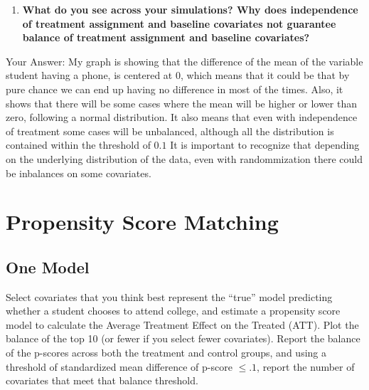 \documentclass[
]{article}
\begin{document}
\begin{enumerate}
    \item \textbf{What do you see across your simulations? Why does independence of treatment assignment and baseline covariates not guarantee balance of treatment assignment and baseline covariates?}
\end{enumerate}

Your Answer: My graph is showing that the difference of the mean of the
variable student having a phone, is centered at \(0\), which means that
it could be that by pure chance we can end up having no difference in
most of the times. Also, it shows that there will be some cases where
the mean will be higher or lower than zero, following a normal
distribution. It also means that even with independence of treatment
some cases will be unbalanced, although all the distribution is
contained within the threshold of \(0.1\) It is important to recognize
that depending on the underlying distribution of the data, even with
randommization there could be inbalances on some covariates.

\hypertarget{propensity-score-matching}{%
\section{Propensity Score Matching}\label{propensity-score-matching}}

\hypertarget{one-model}{%
\subsection{One Model}\label{one-model}}

Select covariates that you think best represent the ``true'' model
predicting whether a student chooses to attend college, and estimate a
propensity score model to calculate the Average Treatment Effect on the
Treated (ATT). Plot the balance of the top 10 (or fewer if you select
fewer covariates). Report the balance of the p-scores across both the
treatment and control groups, and using a threshold of standardized mean
difference of p-score \(\leq .1\), report the number of covariates that
meet that balance threshold.
\end{document}
